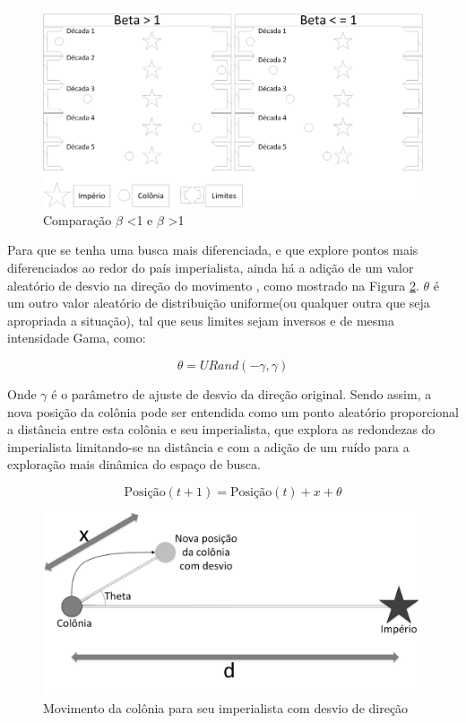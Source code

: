 \begin{figure}[h]
	\centering	
	\includegraphics[scale=0.5]{Figuras/Ilustrations-BetaComparison.png}
	\caption{Comparação $\beta$ \textless 1 e $\beta$ \textgreater 1}
	\label{fig:Ilustrations-BetaComparison}
\end{figure}

Para que se tenha uma busca mais diferenciada, e que explore pontos mais diferenciados ao redor do país imperialista, ainda há a adição de um valor aleatório de desvio na direção do movimento , como mostrado na Figura \ref{fig:Ilustrations-ColonyEmpireMoveWithDistortion}. \(\theta\) é um outro valor aleatório de distribuição uniforme(ou qualquer outra que seja apropriada a situação), tal que seus limites sejam inversos e de mesma intensidade Gama, como:

\begin{equation}
\label{eq:ica8}
\theta = URand(-\gamma, \gamma)
\end{equation}

Onde \(\gamma\) é o parâmetro de ajuste de desvio da direção original. Sendo assim, a nova posição da colônia pode ser entendida como um ponto aleatório proporcional a distância entre esta colônia e seu imperialista, que explora as redondezas do imperialista limitando-se na distância e com a adição de um ruído para a exploração mais dinâmica do espaço de busca.

\begin{equation}
\label{eq:ica9}
\text{Posição} (t+1) = \text{Posição}(t) + x + \theta
\end{equation}

\begin{figure}[h]
	\centering	
	\includegraphics[scale=0.5]{Figuras/Ilustrations-ColonyEmpireMoveWithDistortion.png}
	\caption{Movimento da colônia para seu imperialista com desvio de direção}
	\label{fig:Ilustrations-ColonyEmpireMoveWithDistortion}
\end{figure}

